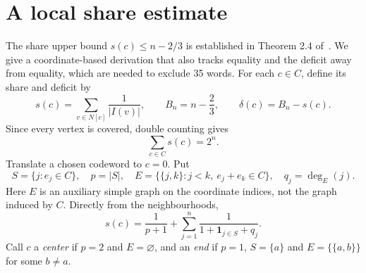 \documentclass[11pt]{article}
\begin{document}
\section{A local share estimate}
The share upper bound $s(c)\le n-2/3$ is established in Theorem 2.4 of~\cite{HLL}. We give a coordinate-based derivation that also tracks equality and the deficit away from equality, which are needed to exclude 35 words. For each $c\in C$, define its share and deficit by
\[
 s(c)=\sum_{v\in N[c]}\frac1{|I(v)|},\qquad
 B_n=n-\frac23,\qquad \delta(c)=B_n-s(c).
\]
Since every vertex is covered, double counting gives
\begin{equation}\label{sum}
 \sum_{c\in C}s(c)=2^n.
\end{equation}
Translate a chosen codeword to $c=0$. Put
\[
 S=\{j:e_j\in C\},\quad p=|S|,\quad
 E=\{\{j,k\}:j<k,\ e_j+e_k\in C\},\quad q_j=\deg_E(j).
\]
Here $E$ is an auxiliary simple graph on the coordinate indices, not the graph induced by $C$. Directly from the neighbourhoods,
\begin{equation}\label{share}
 s(c)=\frac1{p+1}+\sum_{j=1}^n\frac1{1+\mathbf1_{j\in S}+q_j}.
\end{equation}
Call $c$ a \emph{center} if $p=2$ and $E=\varnothing$, and an \emph{end} if $p=1$, $S=\{a\}$ and $E=\{\{a,b\}\}$ for some $b\ne a$.
\end{document}
